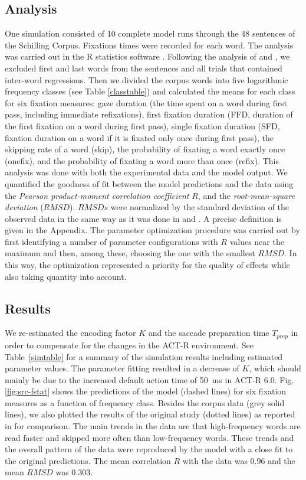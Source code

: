 \subsection{Analysis}
One simulation consisted of 10 complete model runs through the 48 sentences of the Schilling Corpus.  Fixations times were recorded for each word.  The analysis was carried out in the R{} statistics software \cite{R2012}.  Following the analysis of \cite{Reichle1998} and \cite{Salvucci2001}, we excluded first and last words from the sentences and all trials that contained inter-word regressions. Then we divided the corpus words into five logarithmic frequency classes (see Table \ref{classtable}) and calculated the means for each class for six fixation measures: gaze duration (the time spent on a word during first pass, including immediate refixations), first fixation duration (FFD, duration of the first fixation on a word during first pass), single fixation duration (SFD, fixation duration on a word if it is fixated only once during first pass), the skipping rate of a word (skip), the probability of fixating a word exactly once (onefix), and the probability of fixating a word more than once (refix).  This analysis was done with both the experimental data and the model output.
We quantified the goodness of fit between the model predictions and the data using the  \emph{Pearson product-moment correlation coefficient} $R$, and the  \emph{root-mean-square deviation} ($RMSD$).  $RMSDs$ were normalized by the standard deviation of the observed data in the same way as it was done in \citep{Reichle1998} and \cite{Salvucci2001}.  A precise definition is given in the Appendix.
The parameter optimization procedure was carried out by first identifying a number of parameter configurations with $R$ values near the maximum and then, among these, choosing the one with the smallest $RMSD$.  In this way, the optimization represented a priority for the quality of effects while also taking quantity into account.

\subsection{Results}
We re-estimated the encoding factor $K$ and the saccade preparation time $T_{prep}$ in order to compensate for the changes in the ACT-R environment.  See Table~\ref{simtable} for a summary of the simulation results including estimated parameter values.  
The parameter fitting resulted in a decrease of $K$, which should mainly be due to the increased default action time of 50~ms in ACT-R 6.0.
Fig. \ref{fig:src-fstat} shows the predictions of the model (dashed lines) for six fixation measures as a function of frequency class.  Besides the corpus data (grey solid lines), we also plotted the results of the original study (dotted lines) as reported in \cite{Salvucci2001} for comparison.
The main trends in the data are that high-frequency words are read faster and skipped more often than low-frequency words. These trends and the overall pattern of the data were reproduced by the model with a close fit to the original predictions. The mean correlation $R$ with the data was 0.96 and the mean $RMSD$ was 0.303.

